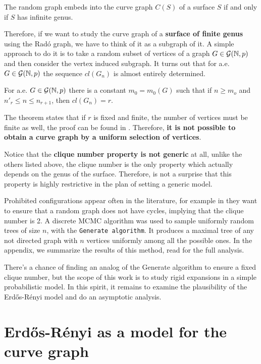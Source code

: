 \begin{theorem}\label{beringAndGaster}
The random graph embeds into the curve graph $C(S)$ of a surface $S$ if and only if $S$ has infinite genus.
\end{theorem}

Therefore, if we want to study the curve graph of a \textbf{surface of finite genus} using the Radó graph, we have to think of it as a subgraph of it. A simple approach to do it is to take a random subset of vertices of a graph $G\in \mathcal{G}(\mathbb{N}, p)$ and then consider the vertex induced subgraph. It turns out that for a.e. $G\in \mathcal{G}(\mathbb{N}, p)$ the sequence $cl(G_n)$ is almost entirely determined.

\begin{theorem}
For a.e. $G \in \mathcal{G}(\mathbb{N},p)$ there is a constant $m_0 = m_{0}(G)$ such that if $n \geq m_o$ and $n'_{r} \leq n \leq n_{r+1}$, then $cl(G_{n}) = r$.
\end{theorem}

The theorem states that if $r$ is fixed and finite, the number of vertices must be finite as well, the proof can be found in \cite[Bollobás p.~284]{Bollobas}. Therefore, \textbf{it is not possible to obtain a curve graph by a uniform selection of vertices}.

Notice that the \textbf{clique number property is not generic} at all, unlike the others listed above, the clique number is the only property which actually depends on the genus of the surface. Therefore, is not a surprise that this property is highly restrictive in the plan of setting a generic model.

Prohibited configurations appear often in the literature, for example in \cite[Alcazar 15]{Alcazar15} they want to ensure that a random graph does not have cycles, implying that the clique number is 2. A discrete MCMC algorithm was used to sample uniformly random trees of size $n$, with the \texttt{Generate algorithm}. It produces a maximal tree of any not directed graph with $n$ vertices uniformly among all the possible ones. In the appendix, we summarize the results of this method, read \cite[Broder 89]{Broder89} for the full analysis.

There's a chance of finding an analog of the Generate algorithm to ensure a fixed clique number, but the scope of this work is to study rigid expansions in a simple probabilistic model. In this spirit, it remains to examine the plausibility of the Erdős-Rényi model and do an asymptotic analysis.

\section{Erdős-Rényi as a model for the curve graph}

